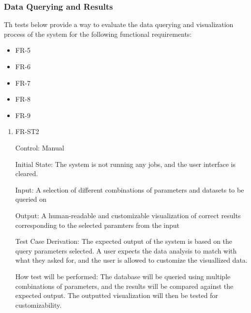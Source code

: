 \documentclass[12pt, titlepage]{article}
\begin{document}
\subsubsection{Data Querying and Results}
Th tests below provide a way to evaluate the data querying and visualization process of the system for the following functional requirements:
\begin{itemize}
  \item FR-5
  \item FR-6
  \item FR-7
  \item FR-8
  \item FR-9
\end{itemize}
\begin{enumerate}

  \item{FR-ST2}
  
  Control: Manual
            
  Initial State: The system is not running any jobs, and the user interface is cleared. 
            
  Input: A selection of different combinations of parameters and datasets to be queried on
            
  Output: A human-readable and customizable visualization of correct results corresponding to the selected paramters from the input
  
  Test Case Derivation: The expected output of the system is based on the query parameters selected. A user expects the data analysis to match with what they asked for, and the user is allowed to customize the visuallized data.
            
  How test will be performed: The database will be queried using multiple combinations of parameters, and the results will be compared against the expected output. The outputted visualization will then be tested for customizability.
  
  \end{enumerate}
\end{document}

